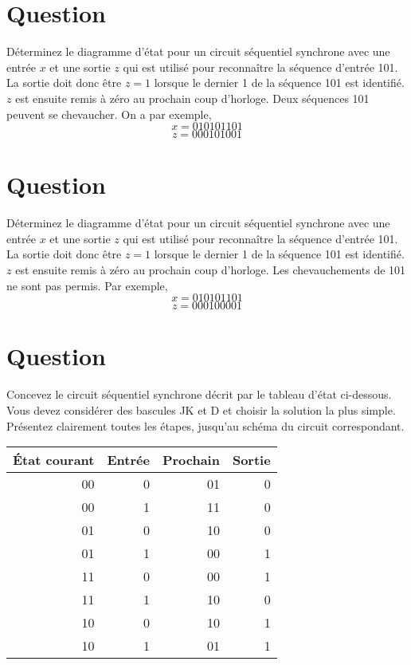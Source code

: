 \documentclass[letter, oneside]{book}
\begin{document}
\section*{Question}
\label{sec:orgc3a5f09}
Déterminez le diagramme d'état pour un circuit séquentiel synchrone
  avec une entrée \(x\) et une sortie \(z\) qui est utilisé pour
  reconnaître la séquence d'entrée 101. La sortie doit donc être \(z=1\)
  lorsque le dernier 1 de la séquence 101 est identifié. \(z\) est
  ensuite remis à zéro au prochain coup d'horloge. Deux séquences 101
  peuvent se chevaucher. On a par exemple,
  $$
    x  =  010101101
    $$
  $$ z = 000101001
    $$

\section*{Question}
\label{sec:orgbdf4220}
Déterminez le diagramme d'état pour un circuit séquentiel synchrone
  avec une entrée \(x\) et une sortie \(z\) qui est utilisé pour
  reconnaître la séquence d'entrée 101. La sortie doit donc être \(z=1\)
  lorsque le dernier 1 de la séquence 101 est identifié. \(z\) est
  ensuite remis à zéro au prochain coup d'horloge. Les chevauchements de 101 ne sont pas 
  permis. Par exemple,
  $$
    x = 010101101
    $$
  $$
    z = 000100001
    $$

\section*{Question}
\label{sec:org12e68ae}
Concevez le circuit séquentiel synchrone décrit par le tableau
  d'état ci-dessous. Vous devez considérer des bascules JK et D et
  choisir la solution la plus simple. Présentez clairement toutes les
  étapes, jusqu'au schéma du circuit correspondant.
\begin{center}
\begin{tabular}{rrrr}
État courant & Entrée & Prochain & Sortie\\[0pt]
\hline
00 & 0 & 01 & 0\\[0pt]
00 & 1 & 11 & 0\\[0pt]
01 & 0 & 10 & 0\\[0pt]
01 & 1 & 00 & 1\\[0pt]
11 & 0 & 00 & 1\\[0pt]
11 & 1 & 10 & 0\\[0pt]
10 & 0 & 10 & 1\\[0pt]
10 & 1 & 01 & 1\\[0pt]
\end{tabular}
\end{center}
\end{document}
